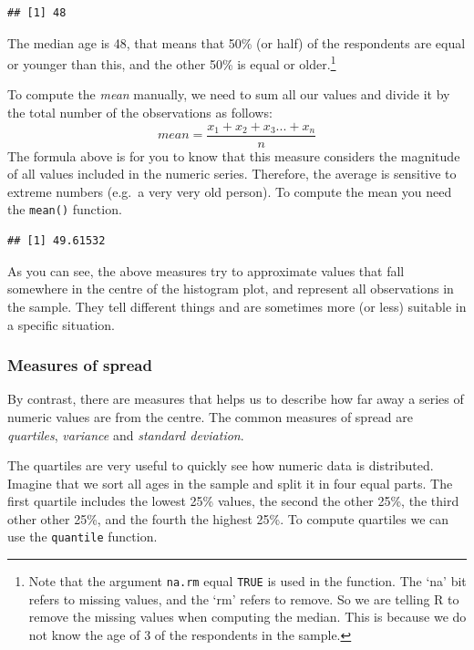 \documentclass[
]{book}
\newenvironment{Shaded}{\begin{snugshade}}{\end{snugshade}}
\newcommand{\AttributeTok}[1]{\textcolor[rgb]{0.13,0.29,0.53}{#1}}
\newcommand{\FunctionTok}[1]{\textcolor[rgb]{0.13,0.29,0.53}{\textbf{#1}}}
\newcommand{\NormalTok}[1]{#1}
\newcommand{\SpecialCharTok}[1]{\textcolor[rgb]{0.81,0.36,0.00}{\textbf{#1}}}
\begin{document}
\begin{verbatim}
## [1] 48
\end{verbatim}

The median age is 48, that means that 50\% (or half) of the respondents are equal or younger than this, and the other 50\% is equal or older.\footnote{Note that the argument \texttt{na.rm} equal \texttt{TRUE} is used in the function. The `na' bit refers to missing values, and the `rm' refers to remove. So we are telling R to remove the missing values when computing the median. This is because we do not know the age of 3 of the respondents in the sample.}

To compute the \emph{mean} manually, we need to sum all our values and divide it by the total number of the observations as follows:
\[ mean =\frac{  x_1 + x_2 + x_3 ...+x_n } {n} \]
The formula above is for you to know that this measure considers the magnitude of all values included in the numeric series. Therefore, the average is sensitive to extreme numbers (e.g.~a very very old person). To compute the mean you need the \texttt{mean()} function.

\begin{Shaded}
\end{Shaded}

\begin{verbatim}
## [1] 49.61532
\end{verbatim}

As you can see, the above measures try to approximate values that fall somewhere in the centre of the histogram plot, and represent all observations in the sample. They tell different things and are sometimes more (or less) suitable in a specific situation.

\hypertarget{measures-of-spread}{%
\subsubsection{Measures of spread}\label{measures-of-spread}}

By contrast, there are measures that helps us to describe how far away a series of numeric values are from the centre. The common measures of spread are \emph{quartiles}, \emph{variance} and \emph{standard deviation}.

The quartiles are very useful to quickly see how numeric data is distributed. Imagine that we sort all ages in the sample and split it in four equal parts. The first quartile includes the lowest 25\% values, the second the other 25\%, the third other other 25\%, and the fourth the highest 25\%. To compute quartiles we can use the \texttt{quantile} function.
\end{document}
